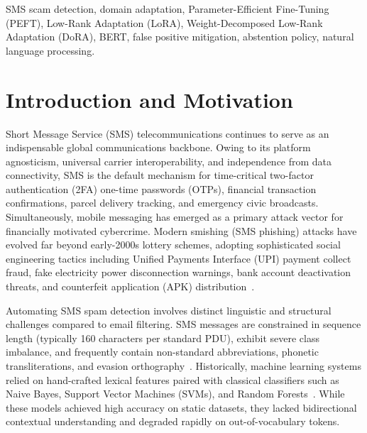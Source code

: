 \documentclass[conference]{IEEEtran}
\begin{document}
\begin{IEEEkeywords}
SMS scam detection, domain adaptation, Parameter-Efficient Fine-Tuning (PEFT), Low-Rank Adaptation (LoRA), Weight-Decomposed Low-Rank Adaptation (DoRA), BERT, false positive mitigation, abstention policy, natural language processing.
\end{IEEEkeywords}

\section{Introduction and Motivation}
\label{sec:intro}

Short Message Service (SMS) telecommunications continues to serve as an indispensable global communications backbone. Owing to its platform agnosticism, universal carrier interoperability, and independence from data connectivity, SMS is the default mechanism for time-critical two-factor authentication (2FA) one-time passwords (OTPs), financial transaction confirmations, parcel delivery tracking, and emergency civic broadcasts. Simultaneously, mobile messaging has emerged as a primary attack vector for financially motivated cybercrime. Modern smishing (SMS phishing) attacks have evolved far beyond early-2000s lottery schemes, adopting sophisticated social engineering tactics including Unified Payments Interface (UPI) payment collect fraud, fake electricity power disconnection warnings, bank account deactivation threats, and counterfeit application (APK) distribution~\cite{almeida2011sms,trai2018tcccpr}.

Automating SMS spam detection involves distinct linguistic and structural challenges compared to email filtering. SMS messages are constrained in sequence length (typically 160 characters per standard PDU), exhibit severe class imbalance, and frequently contain non-standard abbreviations, phonetic transliterations, and evasion orthography~\cite{delany2012sms}. Historically, machine learning systems relied on hand-crafted lexical features paired with classical classifiers such as Naive Bayes, Support Vector Machines (SVMs), and Random Forests~\cite{almeida2011sms}. While these models achieved high accuracy on static datasets, they lacked bidirectional contextual understanding and degraded rapidly on out-of-vocabulary tokens.
\end{document}
